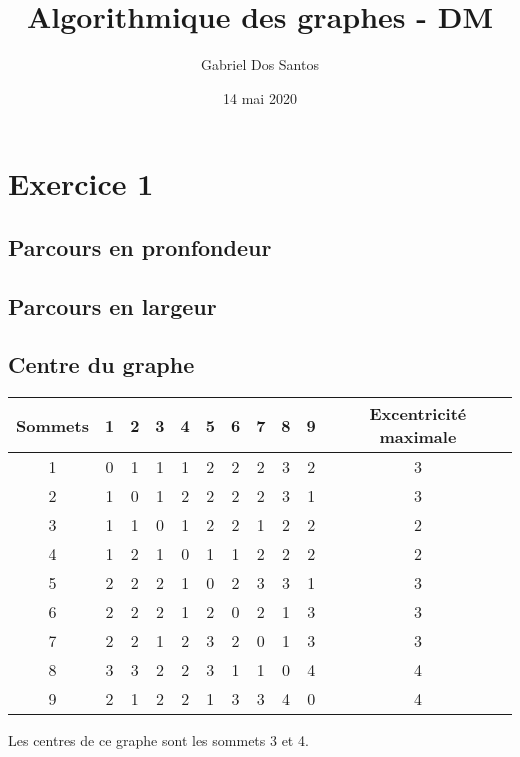 \documentclass{article}
\title{Algorithmique des graphes - DM}
\author{Gabriel Dos Santos}
\date{14 mai 2020}
\begin{document}
\maketitle
\tableofcontents

\section{Exercice 1}
\subsection{Parcours en pronfondeur}
\bigskip
{}
\newpage

\subsection{Parcours en largeur}
\bigskip
{}
\bigskip

\subsection{Centre du graphe}
\bigskip
\begin{tabular}{|c|c|c|c|c|c|c|c|c|c|c|}
\hline
    Sommets & 1 & 2 & 3 & 4 & 5 & 6 & 7 & 8 & 9 & Excentricité maximale \\
\hline
    1       & 0 & 1 & 1 & 1 & 2 & 2 & 2 & 3 & 2 & 3 \\
\hline
    2       & 1 & 0 & 1 & 2 & 2 & 2 & 2 & 3 & 1 & 3 \\
\hline
    3       & 1 & 1 & 0 & 1 & 2 & 2 & 1 & 2 & 2 & 2 \\
\hline
    4       & 1 & 2 & 1 & 0 & 1 & 1 & 2 & 2 & 2 & 2 \\
\hline
    5       & 2 & 2 & 2 & 1 & 0 & 2 & 3 & 3 & 1 & 3 \\
\hline
    6       & 2 & 2 & 2 & 1 & 2 & 0 & 2 & 1 & 3 & 3 \\
\hline
    7       & 2 & 2 & 1 & 2 & 3 & 2 & 0 & 1 & 3 & 3 \\
\hline
    8       & 3 & 3 & 2 & 2 & 3 & 1 & 1 & 0 & 4 & 4 \\
\hline
    9       & 2 & 1 & 2 & 2 & 1 & 3 & 3 & 4 & 0 & 4 \\
\hline
\end{tabular}
\smallskip
\newline
Les centres de ce graphe sont les sommets 3 et 4.
\bigskip
\end{document}
